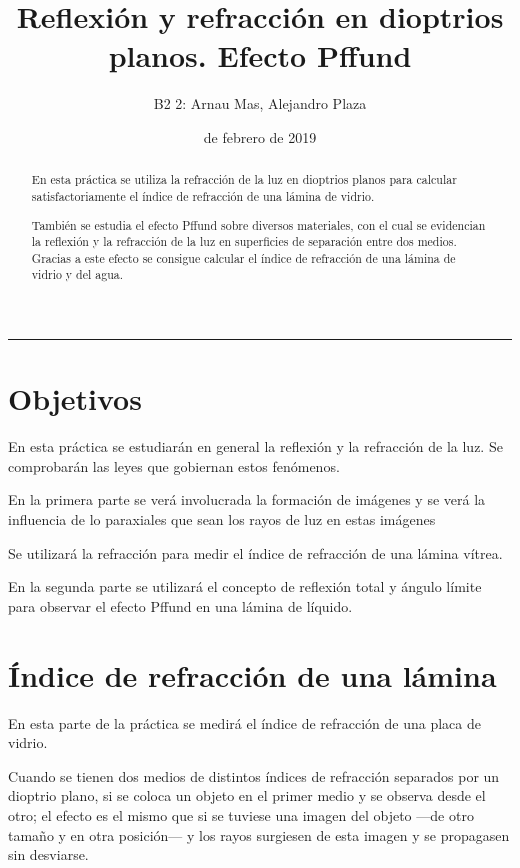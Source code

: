 \documentclass[12pt]{article}
\title{\sffamily {\bfseries Práctica 2:} Reflexión y refracción en dioptrios planos. Efecto Pffund}
\author{\sffamily B2 2: Arnau Mas, Alejandro Plaza}
\date{\sffamily 28 de febrero de 2019}
\numberwithin{table}{section}
\numberwithin{figure}{section}
\numberwithin{equation}{section}
\begin{document}
\maketitle
\renewcommand{\abstractname}{\sffamily \bfseries Resumen:}
\begin{abstract}
	En esta práctica se utiliza la refracción de la luz en dioptrios planos para calcular satisfactoriamente el índice de refracción de una lámina de vidrio.
	
	También se estudia el efecto Pffund sobre diversos materiales, con el cual se evidencian la reflexión y la refracción de la luz en superficies de separación entre dos medios. Gracias a este efecto se consigue calcular el índice de refracción de una lámina de vidrio y del agua.
\end{abstract}
\hrule

\section{Objetivos}
En esta práctica se estudiarán en general la reflexión y la refracción de la luz. Se comprobarán las leyes que gobiernan estos fenómenos.

En la primera parte se verá involucrada la formación de imágenes y se verá la influencia de lo paraxiales que sean los rayos de luz en estas imágenes

Se utilizará la refracción para medir el índice de refracción de una lámina vítrea.

En la segunda parte se utilizará el concepto de reflexión total y ángulo límite para observar el efecto Pffund en una lámina de líquido.

\section{Índice de refracción de una lámina}
En esta parte de la práctica se medirá el índice de refracción de una placa de vidrio.

Cuando se tienen dos medios de distintos índices de refracción separados por un dioptrio plano, si se coloca un objeto en el primer medio y se observa desde el otro; el efecto es el mismo que si se tuviese una imagen del objeto ---de otro tamaño y en otra posición--- y los rayos surgiesen de esta imagen y se propagasen sin desviarse.
\end{document}
